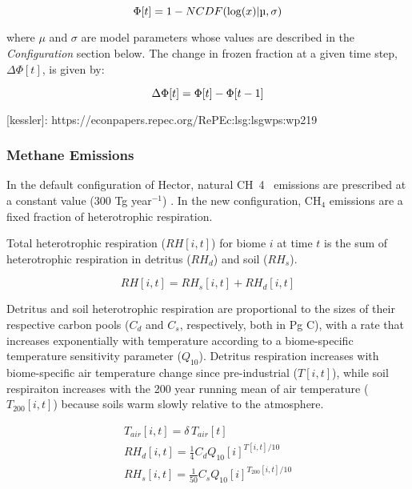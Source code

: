 \documentclass[essd, manuscript]{copernicus}
\begin{document}
\begin{equation*}
\Phi[t] = 1 - NCDF(\log(x) | \mu, \sigma)\\
\end{equation*}

where $\mu$ and $\sigma$ are model parameters whose values are described in the \textit{Configuration} section below.
The change in frozen fraction at a given time step, $\Delta \Phi[t]$, is given by:

\begin{equation*}
\Delta \Phi[t] = \Phi[t] - \Phi[t-1]\\
\end{equation*}

[kessler]: https://econpapers.repec.org/RePEc:lsg:lsgwps:wp219



\subsubsection{Methane Emissions}
In the default configuration of Hector, natural CH~4~ emissions are prescribed at a constant value (300 Tg year$^{-1}$) \citep{hartin_2015_simple}.
In the new configuration, CH$_4$ emissions are a fixed fraction of heterotrophic respiration.

Total heterotrophic respiration ($RH[i,t]$) for biome $i$ at time $t$ is the sum of heterotrophic respiration in detritus ($RH_d$) and soil ($RH_s$).

\begin{equation*} 
RH[i,t] = RH_s[i,t] + RH_d[i,t]
\end{equation*}

Detritus and soil heterotrophic respiration are proportional to the sizes of their respective carbon pools ($C_d$ and $C_s$, respectively, both in Pg C),
with a rate that increases exponentially with temperature according to a biome-specific temperature sensitivity parameter ($Q_{10}$).
Detritus respiration increases with biome-specific air temperature change since pre-industrial ($T[i,t]$),
while soil respiraiton increases with the 200 year running mean of air temperature ($T_{200}[i,t]$) because soils warm slowly relative to the atmosphere.

\begin{gather*}

T_{air}[i,t] = \delta \, T_{air}[t] \\

RH_d[i,t] = \frac{1}{4} C_d Q_{10}[i] ^ {{T}[i,t] / 10} \\

RH_s[i,t] = \frac{1}{50} C_s Q_{10}[i] ^ {T_{200}[i,t] / 10} \\

\end{gather*}
\end{document}
